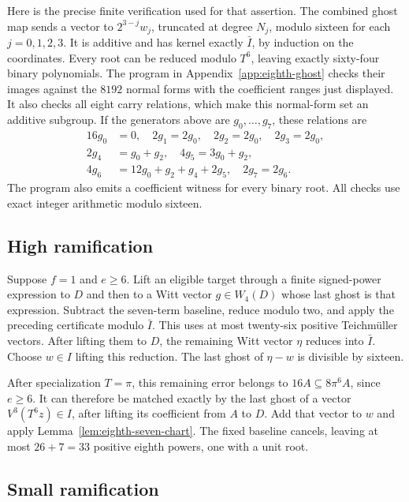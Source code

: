 \documentclass[11pt]{amsart}
\theoremstyle{definition}
\numberwithin{equation}{section}
\begin{document}
Here is the precise finite verification used for that assertion.
The combined ghost map sends a vector to $2^{3-j}w_j$, truncated
at degree $N_j$, modulo sixteen for each $j=0,1,2,3$.
It is additive and has kernel exactly $\bar I$, by induction on the
coordinates. Every root can be reduced modulo $T^6$, leaving exactly
sixty-four binary polynomials. The program in Appendix~\ref{app:eighth-ghost} checks their images
against the $8192$ normal forms with the coefficient ranges just
displayed. It also checks all eight carry relations, which make this
normal-form set an additive subgroup. If the generators above are
$g_0,\ldots,g_7$, these relations are
\[
 \begin{split}
 16g_0&=0,\quad 2g_1=2g_0,\quad2g_2=2g_0,\quad2g_3=2g_0,\\
 2g_4&=g_0+g_2,\quad4g_5=3g_0+g_2,\\
 4g_6&=12g_0+g_2+g_4+2g_5,\quad2g_7=2g_6.
 \end{split}
\]
The program also emits a coefficient witness for every binary root. All checks use exact integer arithmetic modulo sixteen.

\subsection{High ramification}

Suppose $f=1$ and $e\ge6$. Lift an eligible target through a finite
signed-power expression to $D$ and then to a Witt vector $g\in W_4(D)$
whose last ghost is that expression. Subtract the seven-term baseline,
reduce modulo two, and apply the preceding certificate modulo $\bar I$.
This uses at most twenty-six positive Teichm\"uller vectors. After
lifting them to $D$, the remaining Witt vector $\eta$ reduces into
$\bar I$. Choose $w\in I$ lifting this reduction. The last ghost of
$\eta-w$ is divisible by sixteen.

After specialization $T=\pi$, this remaining error belongs to
$16A\subseteq8\pi^6A$, since $e\ge6$. It can therefore be matched
exactly by the last ghost of a vector $V^3(T^6z)\in I$, after lifting
its coefficient from $A$ to $D$. Add that vector to $w$ and apply
Lemma~\ref{lem:eighth-seven-chart}. The fixed baseline cancels, leaving
at most $26+7=33$ positive eighth powers, one with a unit root.


\subsection{Small ramification}
\end{document}
